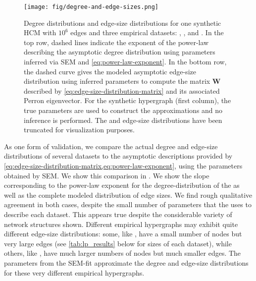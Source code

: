 \begin{figure*}[!ht]
    \centering
    \texttt{[image: fig/degree-and-edge-sizes.png]}
    \caption{Degree distributions and edge-size distributions for one synthetic HCM with $10^6$ edges and three empirical datasets: , , and .
    In the top row, dashed lines indicate the exponent of the power-law describing the asymptotic degree distribution using parameters inferred via SEM and \cref{eq:power-law-exponent}. 
    In the bottom row, the dashed curve gives the modeled asymptotic edge-size distribution using inferred parameters to compute the matrix $\mathbf{W}$ described by \cref{eq:edge-size-distribution-matrix} and its associated Perron eigenvector. 
    For the synthetic hypergraph (first column), the true parameters are used to construct the approximations and no inference is performed.
    The  and  edge-size distributions have been truncated for visualization purposes. 
    }
    \label{fig:degree-edge-size}
\end{figure*}


As one form of validation, we compare the actual degree and edge-size distributions of several datasets to the asymptotic descriptions provided by \cref{eq:edge-size-distribution-matrix,eq:power-law-exponent}, using the parameters obtained by SEM.
We show this comparison in . 
We show the slope corresponding to the power-law exponent for the degree-distribution of the \model as well as the complete modeled distribution of edge sizes.  
We find rough qualitative agreement in both cases, despite the small number of parameters that the \model uses to describe each dataset. 
This appears true despite the considerable variety of network structures shown. 
Different empirical hypergraphs may exhibit quite different edge-size distributions: some, like , have a small number of nodes but very large edges (see \autoref{tab:lp_results} below for sizes of each dataset), while others, like , have much larger numbers of nodes but much smaller edges. 
The parameters from the SEM-\model fit approximate the degree and edge-size distributions for these very different empirical hypergraphs. 



